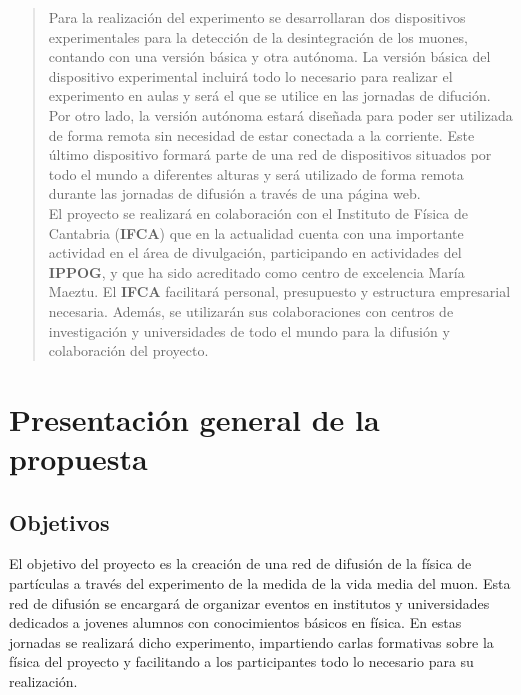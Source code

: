 \documentclass[11pt]{extarticle}
\begin{document}
\begin{abstract}
			Para la realización del experimento se desarrollaran dos dispositivos experimentales para la detección de la desintegración de los muones, contando con una versión básica y otra autónoma. La versión básica del dispositivo experimental incluirá todo lo necesario para realizar el experimento en aulas y será el que se utilice en las jornadas de difución. Por otro lado, la versión autónoma estará diseñada para poder ser utilizada de forma remota sin necesidad de estar conectada a la corriente. Este último dispositivo formará parte de una red de dispositivos situados por todo el mundo a diferentes alturas y será utilizado de forma remota durante las jornadas de difusión a través de una página web.\\

			El proyecto se realizará en colaboración con el Instituto de Física de Cantabria (\textbf{IFCA}) que en la actualidad cuenta con una importante actividad en el área de divulgación, participando en actividades del \textbf{IPPOG}, y que ha sido acreditado como centro de excelencia María Maeztu. El \textbf{IFCA} facilitará personal, presupuesto y estructura empresarial necesaria. Además, se utilizarán sus colaboraciones con centros de investigación y universidades de todo el mundo para la difusión y colaboración del proyecto.

	\end{abstract}


	\newpage
	\tableofcontents
	\newpage


		\section{Presentación general de la propuesta}
			\label{Sec:PreGeneral}

			\subsection{Objetivos}
				\label{SubSec:PreGeneral:Obj}

				El objetivo del proyecto es la creación de una red de difusión de la física de partículas a través del experimento de la medida de la vida media del muon. Esta red de difusión se encargará de organizar eventos en institutos y universidades dedicados a jovenes alumnos con conocimientos básicos en física. En estas jornadas se realizará dicho experimento, impartiendo carlas formativas sobre la física del proyecto y facilitando a los participantes todo lo necesario para su realización.
\end{document}
